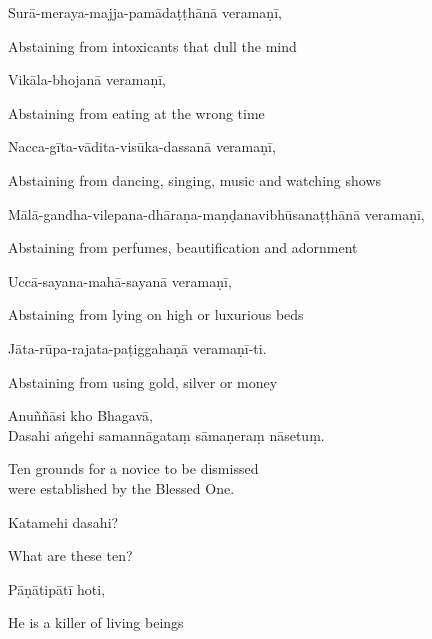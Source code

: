 Surā-meraya-majja-pamādaṭṭhānā veramaṇī,

\begin{english}
  Abstaining from intoxicants that dull the mind
\end{english}

Vikāla-bhojanā veramaṇī,

\begin{english}
  Abstaining from eating at the wrong time
\end{english}

Nacca-gīta-vādita-visūka-dassanā veramaṇī,

\begin{english}
  Abstaining from dancing, singing, music and watching shows
\end{english}

Mālā-gandha-vilepana-dhāraṇa-maṇḍanavibhūsanaṭṭhānā veramaṇī,

\begin{english}
  Abstaining from perfumes, beautification and adornment
\end{english}

Uccā-sayana-mahā-sayanā veramaṇī,

\begin{english}
  Abstaining from lying on high or luxurious beds
\end{english}

Jāta-rūpa-rajata-paṭiggahaṇā veramaṇī-ti.

\begin{english}
  Abstaining from using gold, silver or money
\end{english}


Anuññāsi kho Bhagavā,\\
Dasahi aṅgehi samannāgataṃ sāmaṇeraṃ nāsetuṃ.\\

\begin{english}
  Ten grounds for a novice to be dismissed\\
  were established by the Blessed One.
\end{english}

Katamehi dasahi?

\begin{english}
  What are these ten?
\end{english}

Pāṇātipātī hoti,

\begin{english}
  He is a killer of living beings
\end{english}

